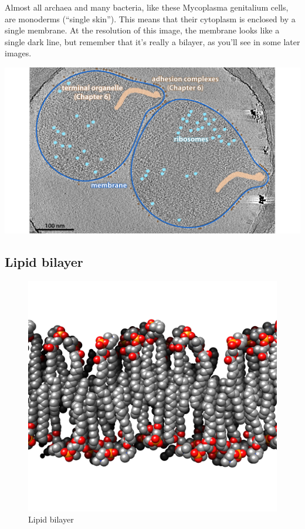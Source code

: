 \documentclass[]{tufte-book}
\begin{document}
Almost all archaea and many bacteria, like these Mycoplasma genitalium
cells, are monoderms (``single skin''). This means that their cytoplasm
is enclosed by a single membrane. At the resolution of this image, the
membrane looks like a single dark line, but remember that it's really a
bilayer, as you'll see in some later images.

\includegraphics{img/02_static/2_1_Mgenitalium}

\subsection{Lipid bilayer}\label{lipid-bilayer}

\begin{figure}
\includegraphics{img/02_schematic/2_1_1_LipidBilayer} \caption[Lipid bilayer]{Lipid bilayer}\label{fig:2-1-1}
\end{figure}
\end{document}
